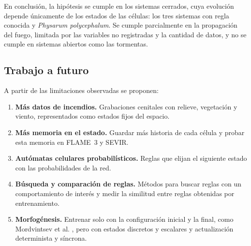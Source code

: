 En conclusión, la hipótesis se cumple en los sistemas cerrados, cuya evolución depende únicamente de los estados de las células: los tres sistemas con regla conocida y \textit{Physarum polycephalum}. Se cumple parcialmente en la propagación del fuego, limitada por las variables no registradas y la cantidad de datos, y no se cumple en sistemas abiertos como las tormentas.

\subsection{Trabajo a futuro}

A partir de las limitaciones observadas se proponen:

\begin{enumerate}
	\item \textbf{Más datos de incendios.} Grabaciones cenitales con relieve, vegetación y viento, representados como estados fijos del espacio.
	\item \textbf{Más memoria en el estado.} Guardar más historia de cada célula y probar esta memoria en FLAME~3 y SEVIR.
	\item \textbf{Autómatas celulares probabilísticos.} Reglas que elijan el siguiente estado con las probabilidades de la red.
	\item \textbf{Búsqueda y comparación de reglas.} Métodos para buscar reglas con un comportamiento de interés y medir la similitud entre reglas obtenidas por entrenamiento.
	\item \textbf{Morfogénesis.} Entrenar solo con la configuración inicial y la final, como Mordvintsev et al. \cite{mordvintsev2020_nca}, pero con estados discretos y escalares y actualización determinista y síncrona.
\end{enumerate}
